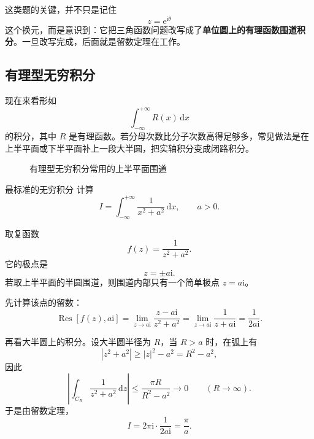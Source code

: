 \begin{tishi}[单位圆方法的本质]
这类题的关键，并不只是记住
\[
    z=\mathrm{e}^{\mathrm{i}\theta}
\]
这个换元，而是意识到：它把三角函数问题改写成了\textbf{单位圆上的有理函数围道积分}。一旦改写完成，后面就是留数定理在工作。
\end{tishi}

\subsection{有理型无穷积分}

现在来看形如
\[
    \int_{-\infty}^{+\infty} R(x)\,\mathrm{d}x
\]
的积分，其中 $R$ 是有理函数。若分母次数比分子次数高得足够多，常见做法是在上半平面或下半平面补上一段大半圆，把实轴积分变成闭路积分。

\begin{figure}[htbp]
\centering
{}
\caption{有理型无穷积分常用的上半平面围道}
\label{fig:upper-half-contour}
\end{figure}

\begin{lizi}{最标准的无穷积分}{}
计算
\[
    I=\int_{-\infty}^{+\infty}\frac{1}{x^2+a^2}\,\mathrm{d}x,
    \qquad a>0.
\]

\begin{jie}
取复函数
\[
    f(z)=\frac{1}{z^2+a^2}.
\]
它的极点是
\[
    z=\pm a\mathrm{i}.
\]
若取上半平面的半圆围道，则围道内部只有一个简单极点 $z=a\mathrm{i}$。

先计算该点的留数：
\[
    \operatorname{Res}[f(z),a\mathrm{i}]
    =
    \lim_{z\to a\mathrm{i}}
    \frac{z-a\mathrm{i}}{z^2+a^2}
    =
    \lim_{z\to a\mathrm{i}}
    \frac{1}{z+a\mathrm{i}}
    =
    \frac{1}{2a\mathrm{i}}.
\]

再看大半圆上的积分。设大半圆半径为 $R$，当 $R>a$ 时，在弧上有
\[
    |z^2+a^2|\ge |z|^2-a^2=R^2-a^2,
\]
因此
\[
    \left|\int_{C_R}\frac{1}{z^2+a^2}\,\mathrm{d}z\right|
    \le
    \frac{\pi R}{R^2-a^2}\to 0
    \qquad (R\to\infty).
\]
于是由留数定理，
\[
    I
    =
    2\pi \mathrm{i}\cdot \frac{1}{2a\mathrm{i}}
    =
    \frac{\pi}{a}.
\]
\end{jie}
\end{lizi}


